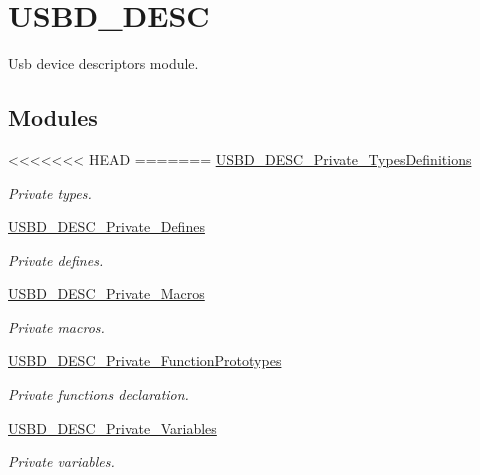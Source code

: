 \hypertarget{group___u_s_b_d___d_e_s_c}{}\section{U\+S\+B\+D\+\_\+\+D\+E\+SC}
\label{group___u_s_b_d___d_e_s_c}


Usb device descriptors module.  


\subsection*{Modules}
\begin{DoxyCompactItemize}
\item 
<<<<<<< HEAD
=======
\hyperlink{group___u_s_b_d___d_e_s_c___private___types_definitions}{U\+S\+B\+D\+\_\+\+D\+E\+S\+C\+\_\+\+Private\+\_\+\+Types\+Definitions}
\begin{DoxyCompactList}\small\item\em Private types. \end{DoxyCompactList}\item 
\hyperlink{group___u_s_b_d___d_e_s_c___private___defines}{U\+S\+B\+D\+\_\+\+D\+E\+S\+C\+\_\+\+Private\+\_\+\+Defines}
\begin{DoxyCompactList}\small\item\em Private defines. \end{DoxyCompactList}\item 
\hyperlink{group___u_s_b_d___d_e_s_c___private___macros}{U\+S\+B\+D\+\_\+\+D\+E\+S\+C\+\_\+\+Private\+\_\+\+Macros}
\begin{DoxyCompactList}\small\item\em Private macros. \end{DoxyCompactList}\item 
\hyperlink{group___u_s_b_d___d_e_s_c___private___function_prototypes}{U\+S\+B\+D\+\_\+\+D\+E\+S\+C\+\_\+\+Private\+\_\+\+Function\+Prototypes}
\begin{DoxyCompactList}\small\item\em Private functions declaration. \end{DoxyCompactList}\item 
\hyperlink{group___u_s_b_d___d_e_s_c___private___variables}{U\+S\+B\+D\+\_\+\+D\+E\+S\+C\+\_\+\+Private\+\_\+\+Variables}
\begin{DoxyCompactList}\small\item\em Private variables. \end{DoxyCompactList}\item 

\end{DoxyCompactItemize}

